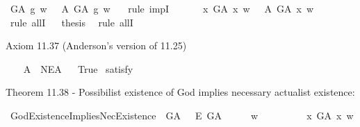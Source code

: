 \begin{isabellebody}
\ {\isachardoublequoteopen}G\isactrlsup A\ g\ w\ \ {\isasymlongrightarrow}\ {\isasymE}\isactrlsup A\ G\isactrlsup A\ g\ w\ {\isachardoublequoteclose}\ \isamarkupfalse%
\ {\isacharparenleft}rule\ impI{\isacharparenright}\isanewline
\ \ \isacommand{{\isacharbraceright}}\isamarkupfalse%
\isanewline
\ \ \isamarkupfalse%
\ {\isachardoublequoteopen}{\isasymforall}x{\isachardot}\ G\isactrlsup A\ x\ w\ \ {\isasymlongrightarrow}\ {\isasymE}\isactrlsup A\ G\isactrlsup A\ x\ w\ {\isachardoublequoteclose}\ \ \isamarkupfalse%
\ {\isacharparenleft}rule\ allI{\isacharparenright}\isanewline
\isacommand{{\isacharbraceright}}\isamarkupfalse%
\isanewline
\ \isamarkupfalse%
\ {\isacharquery}thesis\ \isamarkupfalse%
\ {\isacharparenleft}rule\ allI{\isacharparenright}\ \isanewline
{}\isamarkupfalse%
%
%
%
%
\begin{isamarkuptext}%
Axiom 11.37 (Anderson's version of 11.25)%
\end{isamarkuptext}\isamarkuptrue%
\isamarkupfalse%
\ \ \isanewline
\ A{}{\isacharcolon}\ {\isachardoublequoteopen}{\isasymlfloor}{\isasymP}\ NE\isactrlsup A{\isasymrfloor}{\isachardoublequoteclose}\isanewline
\ \isanewline
{}\isamarkupfalse%
\ True\ \isamarkupfalse%
{\isacharbrackleft}satisfy{\isacharbrackright}%
\ %
%
\isamarkupfalse%
\ %
%
%
%
%
\begin{isamarkuptext}%
Theorem 11.38 - Possibilist existence of God implies necessary actualist existence:%
\end{isamarkuptext}\isamarkuptrue%
\isamarkupfalse%
\ GodExistenceImpliesNecExistence{\isacharcolon}\ {\isachardoublequoteopen}{\isasymlfloor}\isactrlbold {\isasymexists}\ G\isactrlsup A\ \isactrlbold {\isasymrightarrow}\ \ \isactrlbold {\isasymbox}\isactrlbold {\isasymexists}\isactrlsup E\ G\isactrlsup A{\isasymrfloor}{\isachardoublequoteclose}\isanewline
%
%
%
\isamarkupfalse%
\ {\isacharminus}\isanewline
\isacommand{{\isacharbraceleft}}\isamarkupfalse%
\isanewline
\ \ \isamarkupfalse%
\ w\ \isanewline
\ \ \isacommand{{\isacharbraceleft}}\isamarkupfalse%
\isanewline
\ \ \ \ \isamarkupfalse%
\ {\isachardoublequoteopen}{\isasymexists}x{\isachardot}\ G\isactrlsup A\ x\ w{\isachardoublequoteclose}\isanewline
\ \ \ \ \isamarkupfalse%
\ \isamarkupfalse%

\end{isabellebody}
